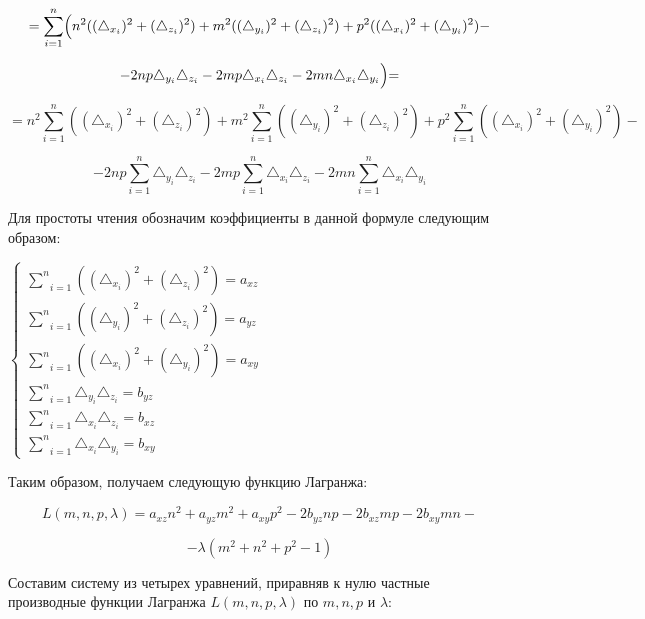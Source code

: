 $$ = \underset{i=1}{\overset{n}{\sum}} \Bigl( n^2 ((\triangle_{x_i})^2 + (\triangle_{z_i})^2) + m^2 ((\triangle_{y_i})^2 + (\triangle_{z_i})^2) + p^2 ((\triangle_{x_i})^2 + (\triangle_{y_i})^2) - $$

$$ - 2 n p \triangle_{y_i} \triangle_{z_i} - 2 m p \triangle_{x_i} \triangle_{z_i} - 2 m n \triangle_{x_i} \triangle_{y_i} \Bigl) = $$

$$ = n^2 \underset{i=1}{\overset{n}{\sum}} \left((\triangle_{x_i})^2 + (\triangle_{z_i})^2\right) + m^2 \underset{i=1}{\overset{n}{\sum}} \left((\triangle_{y_i})^2 + (\triangle_{z_i})^2\right) + p^2 \underset{i=1}{\overset{n}{\sum}} \left((\triangle_{x_i})^2 + (\triangle_{y_i})^2\right) - $$

$$ - 2 n p \underset{i=1}{\overset{n}{\sum}} \triangle_{y_i} \triangle_{z_i} - 2 m p \underset{i=1}{\overset{n}{\sum}} \triangle_{x_i} \triangle_{z_i} - 2 m n \underset{i=1}{\overset{n}{\sum}} \triangle_{x_i} \triangle_{y_i}$$

\newpage
Для простоты чтения обозначим коэффициенты в данной формуле следующим образом:

\begin{center}
	$\begin{cases}
		\underset{i=1}{\overset{n}{\sum}} \left((\triangle_{x_i})^2 + (\triangle_{z_i})^2\right) = a_{xz} \\
		\underset{i=1}{\overset{n}{\sum}} \left((\triangle_{y_i})^2 + (\triangle_{z_i})^2\right) = a_{yz} \\
		\underset{i=1}{\overset{n}{\sum}}\left((\triangle_{x_i})^2 + (\triangle_{y_i})^2\right) = a_{xy} \\
		\underset{i=1}{\overset{n}{\sum}} \triangle_{y_i} \triangle_{z_i} = b_{yz} \\
		\underset{i=1}{\overset{n}{\sum}} \triangle_{x_i} \triangle_{z_i} = b_{xz} \\
		\underset{i=1}{\overset{n}{\sum}} \triangle_{x_i} \triangle_{y_i} = b_{xy}
	\end{cases}$
\end{center}

Таким образом, получаем следующую функцию Лагранжа:

$$L(m, n, p, \lambda) = a_{xz} n^2 + a_{yz} m^2 + a_{xy} p^2 - 2 b_{yz} n p - 2 b_{xz} m p  - 2 b_{xy} m n - $$

$$ - \lambda (m^2 + n^2 + p^2-1)$$

Составим систему из четырех уравнений, приравняв к нулю частные производные функции Лагранжа $L(m, n, p, \lambda)$ по $m, n, p$ и $\lambda$:


